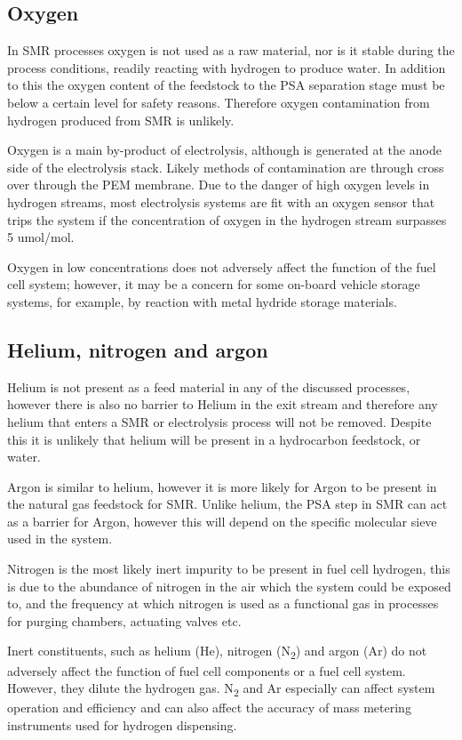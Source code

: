 \subsection*{Oxygen}
In SMR processes oxygen is not used as a raw material, nor is it stable during the process conditions, readily reacting with hydrogen to produce water. In addition to this the oxygen content of the feedstock to the PSA separation stage must be below a certain level for safety reasons. Therefore oxygen contamination from hydrogen produced from SMR is unlikely. 

Oxygen is a main by-product of electrolysis, although is generated at the anode side of the electrolysis stack. Likely methods of contamination are through cross over through the PEM membrane. Due to the danger of high oxygen levels in hydrogen streams, most electrolysis systems are fit with an oxygen sensor that trips the system if the concentration of oxygen in the hydrogen stream surpasses 5 umol/mol. \cite{Bacquart2018}

Oxygen in low concentrations does not adversely affect the function of the fuel cell system; however, it may be a concern for some on-board vehicle storage systems, for example, by reaction with metal hydride storage materials. \cite{InternationalStandardISO14687-2:20122012} 

\subsection*{Helium, nitrogen and argon}
Helium is not present as a feed material in any of the discussed processes, however there is also no barrier to Helium in the exit stream and therefore any helium that enters a SMR or electrolysis process will not be removed. Despite this it is unlikely that helium will be present in a hydrocarbon feedstock, or water.

Argon is similar to helium, however it is more likely for Argon to be present in the natural gas feedstock for SMR. Unlike helium, the PSA step in SMR can act as a barrier for Argon, however this will depend on the specific molecular sieve used in the system. \cite{Bacquart2018}

Nitrogen is the most likely inert impurity to be present in fuel cell hydrogen, this is due to the abundance of nitrogen in the air which the system could be exposed to, and the frequency at which nitrogen is used as a functional gas in processes for purging chambers, actuating valves etc.

Inert constituents, such as helium (He), nitrogen (N\textsubscript{2}) and argon (Ar) do not adversely affect the function of fuel cell components or a fuel cell system. However, they dilute the hydrogen gas. N\textsubscript{2} and Ar especially can affect system operation and efficiency and can also affect the accuracy of mass metering instruments used for hydrogen dispensing. \cite{InternationalStandardISO14687-2:20122012}

